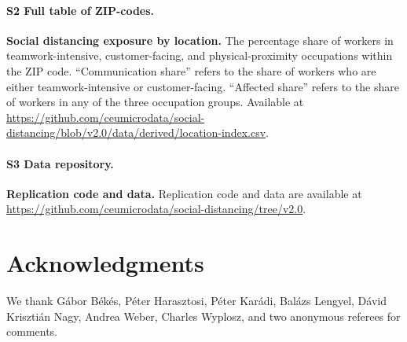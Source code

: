\documentclass[10pt,letterpaper]{article}
\begin{document}
\paragraph*{S2 Full table of ZIP-codes.}
\label{S2_File}
{\bf Social distancing exposure by location.} The percentage share of workers in teamwork-intensive, customer-facing, and physical-proximity occupations within the ZIP code. ``Communication share'' refers to the share of workers who are either teamwork-intensive or customer-facing. ``Affected share'' refers to the share of workers in any of the three occupation groups. Available at \url{https://github.com/ceumicrodata/social-distancing/blob/v2.0/data/derived/location-index.csv}.

\paragraph*{S3 Data repository.}
\label{S3_URL}
{\bf Replication code and data.} Replication code and data are available at \url{https://github.com/ceumicrodata/social-distancing/tree/v2.0}.

\section*{Acknowledgments}
We thank Gábor Békés, Péter Harasztosi, Péter Karádi, Balázs Lengyel, Dávid Krisztián Nagy, Andrea Weber, Charles Wyplosz, and two anonymous referees for comments.

\nolinenumbers



 
\end{document}
